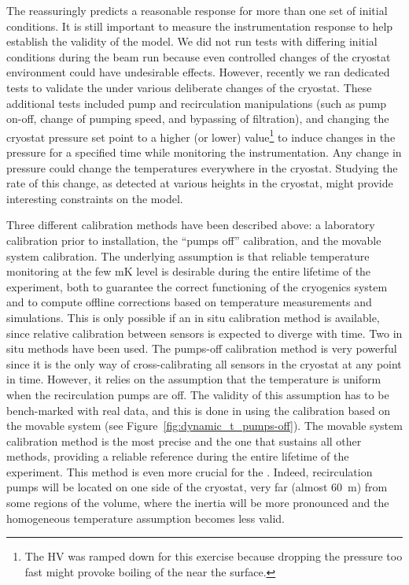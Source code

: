 The  reassuringly predicts a reasonable response for more than one set of initial conditions. It is still important to %
measure the 
instrumentation response to help establish the validity of the  model. We did not run tests with differing initial conditions during the beam run because even controlled changes of the cryostat environment could have undesirable effects. However, recently we ran dedicated tests to validate the  under various deliberate changes of the cryostat. %
These  additional tests included pump and recirculation manipulations (such as pump on-off, change of pumping speed, and bypassing of filtration), and changing the cryostat pressure set point to a higher (or lower) value\footnote{The HV 
was ramped down for this exercise because dropping the pressure too fast might provoke boiling of the  near the surface.} to induce changes in the pressure for a specified time while monitoring the instrumentation. Any change in pressure could change the temperatures everywhere in the cryostat. Studying the rate of this change, as detected at various heights in the cryostat, might provide interesting constraints on the  model.


Three different calibration methods have been described above: a laboratory calibration prior to installation, the ``pumps off'' calibration, and the movable system calibration.
The underlying assumption is that reliable temperature monitoring at the few \si{mK} level is desirable during the entire lifetime of the experiment, both to guarantee the correct functioning of the cryogenics system and to compute offline corrections based on temperature measurements and  simulations. This is only possible if an in situ calibration method is available, since relative calibration between sensors is expected to diverge with time. %
Two in situ methods have been used. The pumps-off calibration method is very powerful since it is the only way of cross-calibrating all sensors in the cryostat at any point in time. However, it relies on the assumption that the temperature is uniform when the recirculation pumps are off. The validity of this assumption has to be bench-marked with real data, and this is done in  using the calibration based on the movable system (see Figure~\ref{fig:dynamic_t_pumps-off}). The movable system calibration method
is the most precise and the one that sustains all other methods, providing a reliable reference during the entire lifetime of the experiment. This method is even more crucial for the . Indeed, recirculation pumps will be located on one side of the cryostat, very far (almost \SI{60}{m}) from some regions of the  volume, where the inertia will be more pronounced and the homogeneous temperature assumption becomes less valid.   

